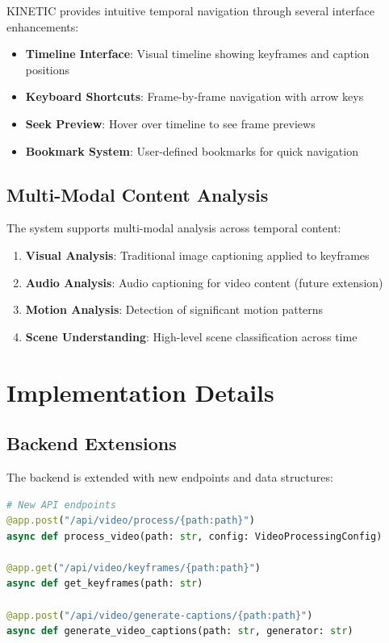 \documentclass[10pt]{article}
\begin{document}
KINETIC provides intuitive temporal navigation through several interface enhancements:

\begin{itemize}
    \item \textbf{Timeline Interface}: Visual timeline showing keyframes and caption positions
    \item \textbf{Keyboard Shortcuts}: Frame-by-frame navigation with arrow keys
    \item \textbf{Seek Preview}: Hover over timeline to see frame previews
    \item \textbf{Bookmark System}: User-defined bookmarks for quick navigation
\end{itemize}

\subsection{Multi-Modal Content Analysis}

The system supports multi-modal analysis across temporal content:

\begin{enumerate}
    \item \textbf{Visual Analysis}: Traditional image captioning applied to keyframes
    \item \textbf{Audio Analysis}: Audio captioning for video content (future extension)
    \item \textbf{Motion Analysis}: Detection of significant motion patterns
    \item \textbf{Scene Understanding}: High-level scene classification across time
\end{enumerate}

\section{Implementation Details}

\subsection{Backend Extensions}

The backend is extended with new endpoints and data structures:

\begin{lstlisting}[language=Python]
# New API endpoints
@app.post("/api/video/process/{path:path}")
async def process_video(path: str, config: VideoProcessingConfig)

@app.get("/api/video/keyframes/{path:path}")
async def get_keyframes(path: str)

@app.post("/api/video/generate-captions/{path:path}")
async def generate_video_captions(path: str, generator: str)
\end{lstlisting}
\end{document}
